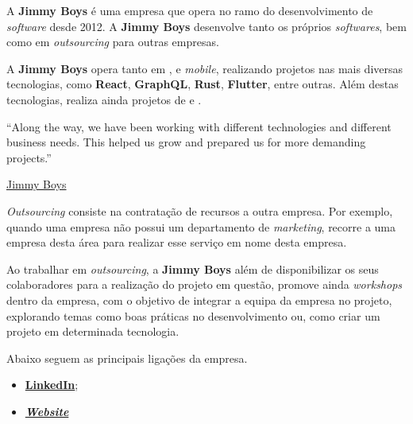 
\begin{minipage}[t!]{0.35\textwidth}
\end{minipage}
\begin{minipage}[t!]{.65\textwidth}
	\minipagerestore

	A \textbf{Jimmy Boys} é uma empresa que opera no ramo do desenvolvimento de \textit{software} desde 2012. A \textbf{Jimmy Boys} desenvolve tanto os próprios \textit{softwares}, bem como em \textit{outsourcing} para outras empresas.

	A \textbf{Jimmy Boys} opera tanto em \textit{}, \textit{} e \textit{mobile}, realizando projetos nas mais diversas tecnologias, como \textbf{React}, \textbf{GraphQL}, \textbf{Rust}, \textbf{Flutter}, entre outras. Além destas tecnologias, realiza ainda projetos de  e .
\end{minipage}

\vspace{0.2cm}

\begin{flushright}
	\begin{quotebox50}
		``Along the way, we have been working with different technologies and different business needs. This helped us grow and prepared us for more demanding projects.''

		\tcblower

		\href{https://www.jimmyboys.pt/about-us}{Jimmy Boys}
	\end{quotebox50}
\end{flushright}

\vspace{0.2cm}

\textit{Outsourcing} consiste na contratação de recursos a outra empresa. Por exemplo, quando uma empresa não possui um departamento de \textit{marketing}, recorre a uma empresa desta área para realizar esse serviço em nome desta empresa.

Ao trabalhar em \textit{outsourcing}, a \textbf{Jimmy Boys} além de disponibilizar os seus colaboradores para a realização do projeto em questão, promove ainda \textit{workshops} dentro da empresa, com o objetivo de integrar a equipa da empresa no projeto, explorando temas como boas práticas no desenvolvimento ou, como criar um projeto em determinada tecnologia.

Abaixo seguem as principais ligações da empresa.

\begin{itemize}
	\item \textbf{\href{https://www.linkedin.com/company/jimmy-boys/}{LinkedIn}};
	\item \textbf{\href{https://jimmyboys.pt}{\textit{Website}}}
\end{itemize}

\newpage